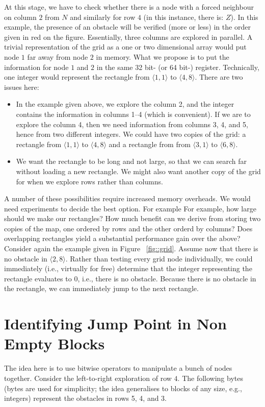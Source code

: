 At this stage, we have to check 
whether there is a node with a forced neighbour on column $2$ from $N$ 
and similarly for row $4$ (in this instance, there is: $Z$).  
In this example, the presence of an obstacle 
will be verified (more or less) in the order given in red on the figure.  
Essentially, three columns are explored in parallel.  
A trivial representation of the grid as a one or two dimensional array
would put node $1$ far away from node $2$ in memory.  
What we propose is to put the information for node $1$ and $2$ 
in the same 32 bit- (or 64 bit-) register.  
Technically, one integer would represent the rectangle 
from $\langle 1,1\rangle$ to $\langle 4,8\rangle$.  
There are two issues here: 
\begin{itemize}
\item 
  In the example given above, we explore the column 2, 
  and the integer contains the information in columns 1--4 
  (which is convenient).  
  If we are to explore the column 4, 
  then we need information from columns 3, 4, and 5, 
  hence from two different integers.  
  We could have two copies of the grid: 
  a rectangle from $\langle 1,1\rangle$ to $\langle 4,8\rangle$ 
  and a rectangle from from $\langle 3,1\rangle$ to $\langle 6,8\rangle$.  
\item 
  We want the rectangle to be long and not large, 
  so that we can search far without loading a new rectangle.  
  We might also want another copy of the grid for when we explore rows
  rather than columns.
\end{itemize}
A number of these possibilities require increased memory overheads. 
We would need experiments to decide the best option. For example
For example, how large should we make our rectangles? How much benefit can we
derive from storing two copies of the map, one ordered by rows and the other
orderd by columns? Does overlapping rectangles yield a substantial
performance gain over the above?
Consider again the example given in Figure  ~\ref{fig::grid}.  
Assume now that there is no obstacle in $\langle 2,8\rangle$.  
Rather than testing every grid node individually, 
we could immediately (i.e., virtually for free) determine 
that the integer representing the rectangle 
evaluates to $0$, i.e., there is no obstacle.  
Because there is no obstacle in the rectangle, 
we can immediately jump to the next rectangle.  
\section{Identifying Jump Point in Non Empty Blocks}
The idea here is to use bitwise operators
to manipulate a bunch of nodes together.  
Consider the left-to-right exploration of row $4$.  
The following bytes (bytes are used for simplicity; 
the idea generalises to blocks of any size, e.g., integers) 
represent the obstacles in rows 5, 4, and 3.  

